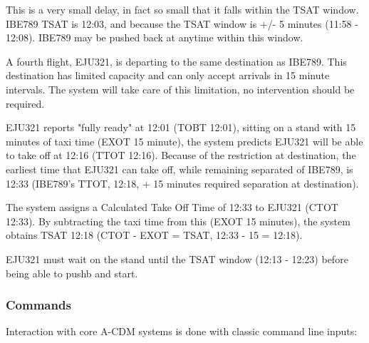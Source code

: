 \documentclass[a4paper,oneside,11pt]{memoir}
\begin{document}
This is a very small delay, in fact so small that it falls within the TSAT window. IBE789 TSAT is 12:03, and because the TSAT window is +/- 5 minutes (11:58 - 12:08). IBE789 may be pushed back at anytime within this window.

\bigskip

A fourth flight, EJU321, is departing to the same destination as IBE789. This destination has limited capacity and can only accept arrivals in 15 minute intervals. The system will take care of this limitation, no intervention should be required.

EJU321 reports "fully ready" at 12:01 (TOBT 12:01), sitting on a stand with 15 minutes of taxi time (EXOT 15 minute), the system predicts EJU321 will be able to take off at 12:16 (TTOT 12:16). Because of the restriction at destination, the earliest time that EJU321 can take off, while remaining separated of IBE789, is 12:33 (IBE789's TTOT, 12:18, + 15 minutes required separation at destination).

The system assigns a Calculated Take Off Time of 12:33 to EJU321 (CTOT 12:33). By subtracting the taxi time from this (EXOT 15 minutes), the system obtains TSAT 12:18 (CTOT - EXOT = TSAT, 12:33 - 15 = 12:18).

EJU321 must wait on the stand until the TSAT window (12:13 - 12:23) before being able to pushb and start.


\subsubsection{Commands}

Interaction with core A-CDM systems is done with classic command line inputs:
\end{document}
